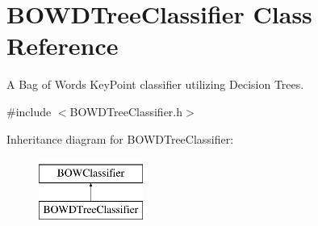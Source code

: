 \hypertarget{classBOWDTreeClassifier}{
\section{BOWDTreeClassifier Class Reference}
\label{classBOWDTreeClassifier}
}


A Bag of Words KeyPoint classifier utilizing Decision Trees.  




{\ttfamily \#include $<$BOWDTreeClassifier.h$>$}

Inheritance diagram for BOWDTreeClassifier:\begin{figure}[H]
\begin{center}
\leavevmode
\includegraphics[height=2cm]{classBOWDTreeClassifier}
\end{center}
\end{figure}

